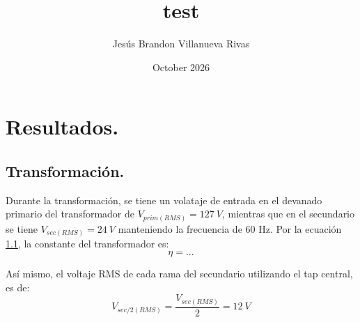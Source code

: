 \documentclass{article}
\title{test}
\author{Jesús Brandon Villanueva Rivas}
\date{October 2026}
\begin{document}
\maketitle

\section{Resultados.}

\subsection{Transformación.}

Durante la transformación, se tiene un volataje de entrada en el devanado primario del transformador de $V_{prim(RMS)} = 127~V$, mientras que en el secundario se tiene $V_{sec(RMS)} = 24~V$ manteniendo la frecuencia de 60 Hz. Por la ecuación \ref{}, la constante del transformador es:
$$\eta=...$$

Así mismo, el voltaje RMS de cada rama del secundario utilizando el tap central, es de:
$$V_{sec/2(RMS)} = \frac{V_{sec(RMS)}}{2} = 12~V$$
\end{document}
